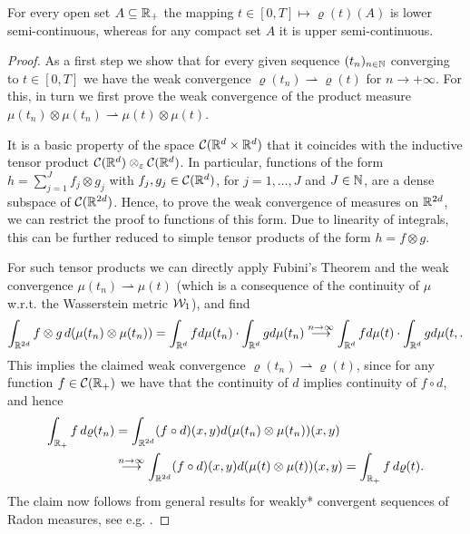 \begin{lemma}\label{rhosc}
	For every open set $A\subseteq\mathbb{R}_+$ the mapping $t \in [0,T] \mapsto\varrho(t)(A)$ is lower semi-continuous, whereas for
	any compact set $A$ it is upper semi-continuous.
\end{lemma}

\begin{proof}As a first step we show that for every given sequence $(t_n)_{n \in \mathbb{N}}$ converging to $t\in [0,T]$ we have the weak
	convergence $\varrho(t_n)\rightharpoonup\varrho(t)$ for $n \rightarrow +\infty$. For this, in turn we first prove the weak convergence of the product measure
	$\mu(t_n)\otimes\mu(t_n)\rightharpoonup\mu(t)\otimes\mu(t)$.
	
	It is a basic property of the space $\mathcal{C}(\mathbb{R}^d\times\mathbb{R}^d)$ that it coincides with the inductive tensor product
	$\mathcal{C}(\mathbb{R}^d)\otimes_\varepsilon \mathcal{C}(\mathbb{R}^d)$. In particular, functions of the form $h=\sum_{j=1}^J f_j\otimes g_j$ with
	$f_j,g_j\in \mathcal{C}(\mathbb{R}^d)$, for $j=1,\ldots,J$ and $J\in\mathbb{N}$, are a dense subspace of $\mathcal{C}(\mathbb{R}^{2d})$. Hence, to prove the weak
	convergence of measures on $\mathbb{R}^{2d}$, we can restrict the proof to functions of this form. Due to linearity of
	integrals, this can be further reduced to simple tensor products of the form $h=f\otimes g$.
	
	For such tensor products we can directly apply Fubini's Theorem and the weak convergence
	$\mu(t_n)\rightharpoonup\mu(t)$ (which is a consequence of the continuity of $\mu$ w.r.t. the
	Wasserstein metric $\mathcal{W}_1$), and find
	\[
		\int_{\mathbb{R}^{2d}}f\otimes g\, d(\mu(t_n)\otimes\mu(t_n))
			=\int_{\mathbb{R}^d}f d\mu(t_n)\cdot\int_{\mathbb{R}^d}g d\mu(t_n)
			\stackrel{n\rightarrow\infty}{\longrightarrow}\int_{\mathbb{R}^d}f d\mu(t)\cdot\int_{\mathbb{R}^d}g d\mu(t,.
	\]
	This implies the claimed weak convergence $\varrho(t_n)\rightharpoonup\varrho(t)$, since for any
	function $f\in \mathcal{C}(\mathbb{R}_+)$ we have that the continuity of $d$ implies continuity of $f\circ d$, and hence
	\begin{align*}
		\int_{\mathbb{R}_+}f\,d\varrho(t_n)
			&=\int_{\mathbb{R}^{2d}}(f\circ d)(x,y)d(\mu(t_n)\otimes\mu(t_n))(x,y)\\
			&\stackrel{n\rightarrow\infty}{\longrightarrow}
				\int_{\mathbb{R}^{2d}}(f\circ d)(x,y)d(\mu(t)\otimes\mu(t))(x,y)
			=\int_{\mathbb{R}_+}f\,d\varrho(t).
	\end{align*}
	The claim now follows from general results for weakly* convergent sequences of Radon measures, see e.g. \cite[Proposition 1.62]{AFP00}.
\end{proof}

